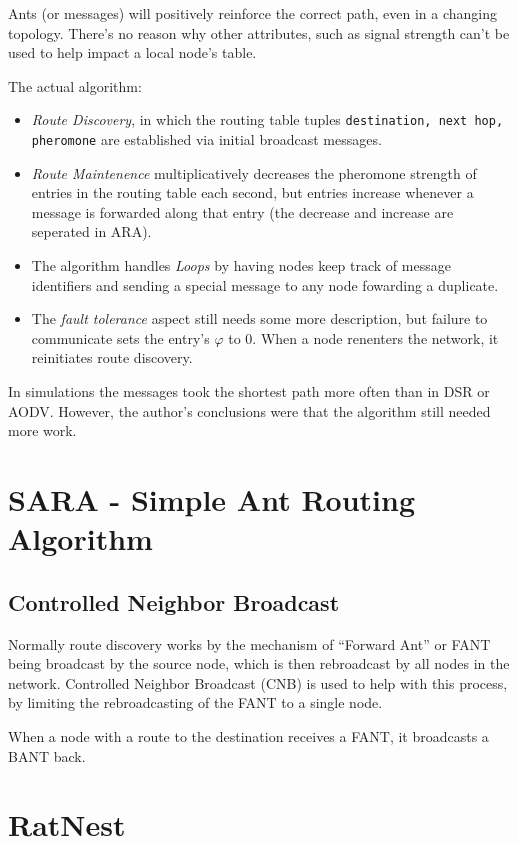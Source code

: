 \documentclass[a4paper]{article}
\begin{document}
Ants (or messages) will positively reinforce the correct path, even in a changing topology.  There's no reason why other attributes, such as signal strength can't be used to help impact a local node's table.

The actual algorithm:
\begin{itemize}
    \item \textit{Route Discovery}, in which the routing table tuples \texttt{destination, next hop, pheromone} are established via initial broadcast messages.
    \item \textit{Route Maintenence} multiplicatively decreases the pheromone strength of entries in the routing table each second, but entries increase whenever a message is forwarded along that entry (the decrease and increase are seperated in ARA).
    \item The algorithm handles \textit{Loops} by having nodes keep track of message identifiers and sending a special message to any node fowarding a duplicate. 
    \item  The \textit{fault tolerance} aspect still needs some more description, but failure to communicate sets the entry's  $\varphi$ to 0.  When a node renenters the network, it reinitiates route discovery.
\end{itemize}


In simulations the messages took the shortest path more often than in DSR or AODV.  However, the author's conclusions were that the algorithm still needed more work.


\section{SARA - Simple Ant Routing Algorithm}


\subsection{Controlled Neighbor Broadcast}
Normally route discovery works by the mechanism of ``Forward Ant'' or FANT being broadcast by the source node, which is then rebroadcast by all nodes in the network.  Controlled Neighbor Broadcast (CNB) is used to help with this process, by limiting the rebroadcasting of the FANT to a single node.

When a node with a route to the destination receives a FANT, it broadcasts a BANT back.

\section{RatNest}
\end{document}

